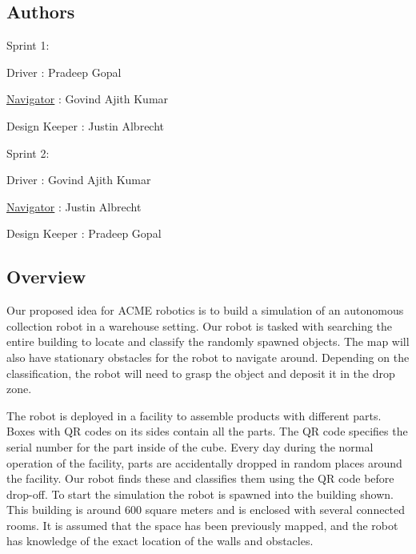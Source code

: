 \href{https://travis-ci.org/Pradeep-Gopal/ros_collection_robot}{\tt } \href{https://coveralls.io/github/Pradeep-Gopal/ros_collection_robot?branch=main}{\tt } \subsection*{\href{https://opensource.org/licenses/MIT}{\tt } }

\subsection*{Authors}

Sprint 1\+:
\begin{DoxyItemize}
\item Driver \+: Pradeep Gopal
\item \hyperlink{class_navigator}{Navigator} \+: Govind Ajith Kumar
\item Design Keeper \+: Justin Albrecht
\end{DoxyItemize}

Sprint 2\+:
\begin{DoxyItemize}
\item Driver \+: Govind Ajith Kumar
\item \hyperlink{class_navigator}{Navigator} \+: Justin Albrecht
\item Design Keeper \+: Pradeep Gopal
\end{DoxyItemize}

\subsection*{Overview}

Our proposed idea for A\+C\+ME robotics is to build a simulation of an autonomous collection robot in a warehouse setting. Our robot is tasked with searching the entire building to locate and classify the randomly spawned objects. The map will also have stationary obstacles for the robot to navigate around. Depending on the classification, the robot will need to grasp the object and deposit it in the drop zone.

The robot is deployed in a facility to assemble products with different parts. Boxes with QR codes on its sides contain all the parts. The QR code specifies the serial number for the part inside of the cube. Every day during the normal operation of the facility, parts are accidentally dropped in random places around the facility. Our robot finds these and classifies them using the QR code before drop-\/off. To start the simulation the robot is spawned into the building shown. This building is around 600 square meters and is enclosed with several connected rooms. It is assumed that the space has been previously mapped, and the robot has knowledge of the exact location of the walls and obstacles.

